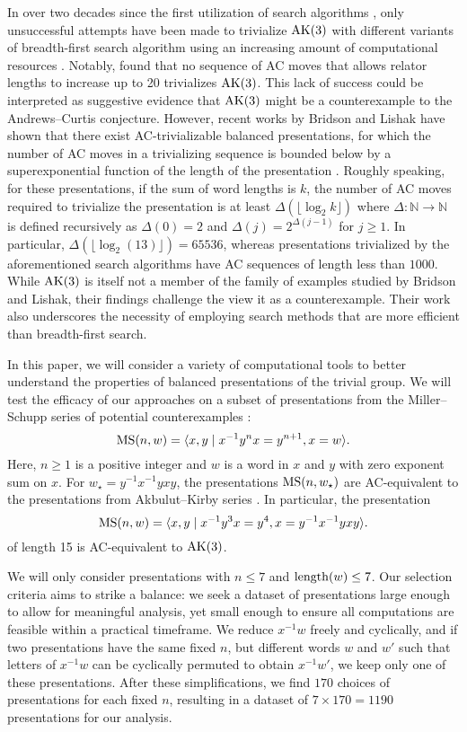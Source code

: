 In over two decades since the first utilization of search algorithms \cite{genetic, bfs-ac}, only unsuccessful attempts have been made to trivialize $\text{AK}(3)$ with different variants of breadth-first search algorithm using an increasing amount of computational resources \cite{Bowman-McCaul, krawiec2016distance, Panteleev-Ushakov}.
Notably, \cite{Panteleev-Ushakov} found that no sequence of AC moves that allows relator lengths to increase up to 20 trivializes $\text{AK}(3)$.
This lack of success could be interpreted as suggestive evidence that $\text{AK}(3)$ might be a counterexample to the Andrews--Curtis conjecture.
However, recent works by Bridson and Lishak have shown that there exist AC-trivializable balanced presentations, for which the number of AC moves in a trivializing sequence is bounded below by a superexponential function of the length of the presentation \cite{Bridson, Lishak}.
Roughly speaking, for these presentations, if the sum of word lengths is $k$, the number of AC moves required to trivialize the presentation is at least $\Delta (\lfloor \log_2 k \rfloor)$ where $\Delta \colon \mathbb{N} \to \mathbb{N}$ is defined recursively as $\Delta(0) = 2$ and $\Delta (j) = 2^{\Delta(j-1)}$ for $j \geq 1$.
In particular, $\Delta (\lfloor \log_2 (13) \rfloor) = 65536$, whereas presentations trivialized by the aforementioned search algorithms have AC sequences of length less than $1000$.
While $\text{AK}(3)$ is itself not a member of the family of examples studied by Bridson and Lishak, their findings challenge the view it as a counterexample.
Their work also underscores the necessity of employing search methods that are more efficient than breadth-first search.

In this paper, we will consider a variety of computational tools to better understand the properties of balanced presentations of the trivial group.
We will test the efficacy of our approaches on a subset of presentations from the Miller--Schupp series of potential counterexamples \cite{Miller--Schupp}:
\[
\text{MS}(n, w) = \langle x, y \mid x^{-1} y^n x = y^{n+1}, x = w\rangle.
\]
Here, $n \ge 1$ is a positive integer and $w$ is a word in $x$ and $y$ with zero exponent sum on $x$.
For $w_\star = y^{-1} x^{-1} y x y$, the presentations $\text{MS}(n, w_\star)$ are AC-equivalent to the presentations from Akbulut--Kirby series \cite{MMS}.
In particular, the presentation
\[
\text{MS}(n, w) = \langle x, y \mid x^{-1} y^3 x = y^{4}, x = y^{-1} x^{-1} y x y\rangle.
\]
of length 15 is AC-equivalent to $\text{AK}(3)$.

We will only consider presentations with $n \leq 7$ and $\operatorname{length}(w) \leq 7$.
Our selection criteria aims to strike a balance: we seek a dataset of presentations large enough to allow for meaningful analysis, yet small enough to ensure all computations are feasible within a practical timeframe.
We reduce $x^{-1}w$ freely and cyclically,
and if two presentations have the same fixed $n$, but different words $w$ and $w'$ such that letters of $x^{-1} w$ can be cyclically permuted to obtain $x^{-1} w'$, we keep only one of these presentations.
After these simplifications, we find $170$ choices of presentations for each fixed $n$, resulting in a dataset of $7 \times 170 = 1190$ presentations for our analysis.


